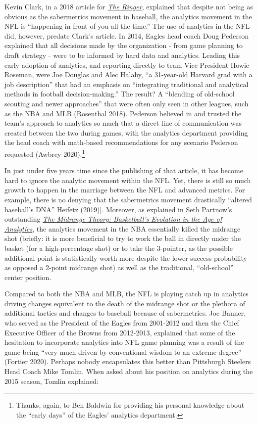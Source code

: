 \documentclass[
  letterpaper,
]{krantz}
\begin{document}
Kevin Clark, in a 2018 article for
\href{https://www.theringer.com/nfl/2018/12/19/18148153/nfl-analytics-revolution}{\emph{The
Ringer}}, explained that despite not being as obvious as the
sabermetrics movement in baseball, the analytics movement in the NFL is
``happening in front of you all the time.'' The use of analytics in the
NFL did, however, predate Clark's article. In 2014, Eagles head coach
Doug Pederson explained that all decisions made by the organization -
from game planning to draft strategy - were to be informed by hard data
and analytics. Leading this early adoption of analytics, and reporting
directly to team Vice President Howie Roseman, were Joe Douglas and Alec
Halaby, ``a 31-year-old Harvard grad with a job description'' that had
an emphasis on ``integrating traditional and analytical methods in
football decision-making.'' The result? A ``blending of old-school
scouting and newer approaches'' that were often only seen in other
leagues, such as the NBA and MLB (Rosenthal 2018). Pederson believed in
and trusted the team's approach to analytics so much that a direct line
of communication was created between the two during games, with the
analytics department providing the head coach with math-based
recommendations for any scenario Pederson requested (Awbrey
2020).\footnote{Thanks, again, to Ben Baldwin for providing his personal
  knowledge about the ``early days'' of the Eagles' analytics
  department.}

In just under five years time since the publishing of that article, it
has become hard to ignore the analytic movement within the NFL. Yet,
there is still so much growth to happen in the marriage between the NFL
and advanced metrics. For example, there is no denying that the
sabermetrics movement drastically ``altered baseball's DNA'' Heifetz
(2019){]}. Moreover, as explained in Seth Partnow's outstanding
\href{https://www.amazon.com/Midrange-Theory-Basketballs-Evolution-Analytics/dp/1637270968/ref=tmm_pap_swatch_0?_encoding=UTF8\&qid=1656245879\&sr=8-4}{\emph{The
Midrange Theory: Basketball's Evolution in the Age of Analytics}}, the
analytics movement in the NBA essentially killed the midrange shot
(briefly: it is more beneficial to try to work the ball in directly
under the basket (for a high-percentage shot) or to take the 3-pointer,
as the possible additional point is statistically worth more despite the
lower success probability as opposed a 2-point midrange shot) as well as
the traditional, ``old-school'' center position.

Compared to both the NBA and MLB, the NFL is playing catch up in
analytics driving changes equivalent to the death of the midrange shot
or the plethora of additional tactics and changes to baseball because of
sabermetrics. Joe Banner, who served as the President of the Eagles from
2001-2012 and then the Chief Executive Officer of the Browns from
2012-2013, explained that some of the hesitation to incorporate
analytics into NFL game planning was a result of the game being ``very
much driven by conventional wisdom to an extreme degree'' (Fortier
2020). Perhaps nobody encapsulates this better than Pittsburgh Steelers
Head Coach Mike Tomlin. When asked about his position on analytics
during the 2015 season, Tomlin explained:
\end{document}
